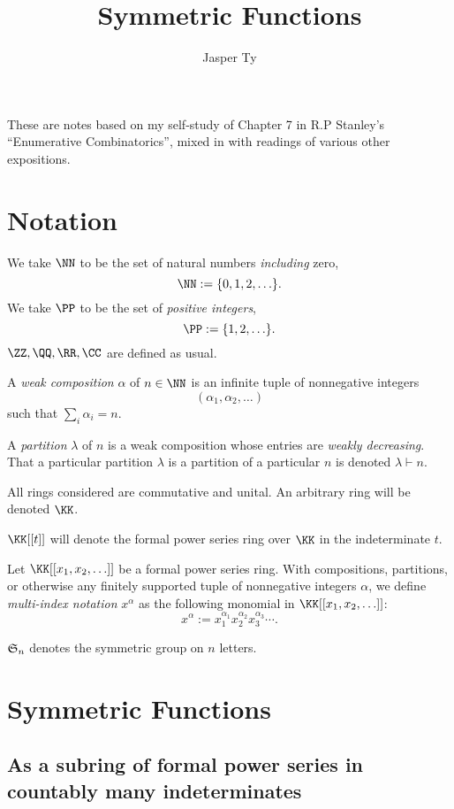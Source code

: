 \documentclass{article}
\title{Symmetric Functions}
\author{Jasper Ty}
\date{}
\newcommand{\frkS}{\ensuremath\mathfrak{S}}
\begin{document}
\maketitle

These are notes based on my self-study of Chapter 7 in R.P Stanley's ``Enumerative Combinatorics'', mixed in with readings of various other expositions. 


\tableofcontents

\section{Notation}
We take $\NN$ to be the set of natural numbers \textit{including} zero,
\[
    \NN := \{0,1,2,\ldots\}.
\]
We take $\PP$ to be the set of \textit{positive integers},
\[
    \PP := \{1,2,\ldots\}.
\]
$\ZZ,\QQ,\RR,\CC$ are defined as usual.

A \textit{weak composition} $\alpha$ of $n \in \NN$ is an infinite tuple of nonnegative integers 
\[
    (\alpha_1, \alpha_2, \ldots)
\]
such that $\sum_i \alpha_i = n$.

A \textit{partition} $\lambda$ of $n$ is a weak composition whose entries are \textit{weakly decreasing}. That a particular partition $\lambda$ is a partition of a particular $n$ is denoted $\lambda \vdash n$.

All rings considered are commutative and unital. An arbitrary ring will be denoted $\KK$.

$\KK[[t]]$ will denote the formal power series ring over $\KK$ in the indeterminate $t$.

Let $\KK[[x_1,x_2,\ldots]]$ be a formal power series ring. With compositions, partitions, or otherwise any finitely supported tuple of nonnegative integers $\alpha$, we define \textit{multi-index notation} $x^\alpha$ as the following monomial in $\KK[[x_1,x_2,\ldots]]$:
\[
    x^\alpha := x_1^{\alpha_1}x_2^{\alpha_2}x_3^{\alpha_3}\cdots.
\]

$\frkS_n$ denotes the symmetric group on $n$ letters.

\section{Symmetric Functions}
\subsection{As a subring of formal power series in countably many indeterminates}
\end{document}
